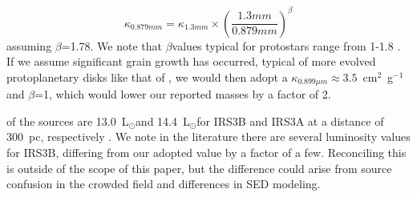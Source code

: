 \documentclass[twocolumn, 12pt]{aastex63}
\newcommand{\lsun}{L$_{\odot}$}
\begin{document}
\begin{equation}
    \kappa_{0.879 mm} = \kappa_{1.3 mm}\times\left(\frac{1.3 mm}{0.879 mm}\right)^{\beta}
\end{equation}
assuming $\beta$=1.78. We note that $\beta$\space values typical for protostars range from 1-1.8 \citep{2009ApJ...696..841K, 2013PhDT.......434S}.  If we assume significant grain growth has occurred, typical of more evolved protoplanetary disks like that of \citet{2009ApJ...700.1502A}, we would then adopt a $\kappa_{0.899\mu m}\approx3.5$~cm$^{2}$~g$^{-1}$\space and $\beta$=1, which would lower our reported masses by a factor of 2.

 of the sources are  13.0~\lsun\space and 14.4~\lsun\space for IRS3B and IRS3A at a distance of 300~pc, respectively \citep[8.3~\lsun\space and 9.2~\lsun\space for IRS3B and IRS3A, respectively at 230~pc; ][]{2016ApJ...818...73T}. We note  in the literature there are several luminosity values for IRS3B, differing from our adopted value by a factor of a few. Reconciling this is outside of the scope of this paper, but the difference could arise from source confusion in the crowded field and differences in SED modeling.
\end{document}
